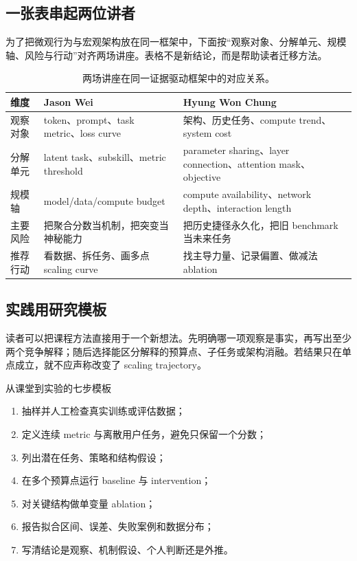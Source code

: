 \documentclass[a4paper]{article}
\begin{document}
\subsection{一张表串起两位讲者}

为了把微观行为与宏观架构放在同一框架中，下面按“观察对象、分解单元、规模轴、风险与行动”对齐两场讲座。表格不是新结论，而是帮助读者迁移方法。

\begin{table}[H]
\centering
\begin{tabularx}{\textwidth}{L{0.18\textwidth} X X}
\toprule
维度 & Jason Wei & Hyung Won Chung \\
\midrule
观察对象 & token、prompt、task metric、loss curve & 架构、历史任务、compute trend、system cost \\
分解单元 & latent task、subskill、metric threshold & parameter sharing、layer connection、attention mask、objective \\
规模轴 & model/data/compute budget & compute availability、network depth、interaction length \\
主要风险 & 把聚合分数当机制，把突变当神秘能力 & 把历史捷径永久化，把旧 benchmark 当未来任务 \\
推荐行动 & 看数据、拆任务、画多点 scaling curve & 找主导力量、记录偏置、做减法 ablation \\
\bottomrule
\end{tabularx}
\caption{两场讲座在同一证据驱动框架中的对应关系。}
\end{table}

\subsection{实践用研究模板}

读者可以把课程方法直接用于一个新想法。先明确哪一项观察是事实，再写出至少两个竞争解释；随后选择能区分解释的预算点、子任务或架构消融。若结果只在单点成立，就不应声称改变了 scaling trajectory。

\begin{importantbox}{从课堂到实验的七步模板}
\begin{enumerate}
  \item 抽样并人工检查真实训练或评估数据；
  \item 定义连续 metric 与离散用户任务，避免只保留一个分数；
  \item 列出潜在任务、策略和结构假设；
  \item 在多个预算点运行 baseline 与 intervention；
  \item 对关键结构做单变量 ablation；
  \item 报告拟合区间、误差、失败案例和数据分布；
  \item 写清结论是观察、机制假设、个人判断还是外推。
\end{enumerate}
\end{importantbox}
\end{document}
